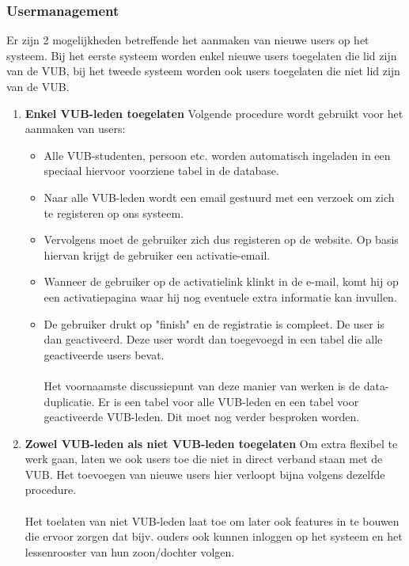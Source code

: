 \subsubsection{Usermanagement}
Er zijn 2 mogelijkheden betreffende het aanmaken van nieuwe users op het systeem. Bij het eerste systeem worden enkel nieuwe users toegelaten die lid zijn van de VUB, bij het tweede systeem worden ook users toegelaten die niet lid zijn van de VUB.
\begin{enumerate}
	\item
	{
		\textbf{Enkel VUB-leden toegelaten}
			Volgende procedure wordt gebruikt voor het aanmaken van users:
		\begin{itemize}
			\item Alle VUB-studenten, persoon etc. worden automatisch ingeladen in een speciaal hiervoor voorziene tabel in de database.
			\item Naar alle VUB-leden wordt een email gestuurd met een verzoek om zich te registeren op ons systeem.
			\item Vervolgens moet de gebruiker zich dus registeren op de website. Op basis hiervan krijgt de gebruiker een activatie-email.
			\item Wanneer de gebruiker op de activatielink klinkt in de e-mail, komt hij op een activatiepagina waar hij nog eventuele extra informatie kan invullen. 
			\item 
			{
				De gebruiker drukt op "finish" en de registratie is compleet. De user is dan geactiveerd. Deze user wordt dan toegevoegd in een tabel die alle geactiveerde users bevat.
				\\
				\\
				Het voornaamste discussiepunt van deze manier van werken is de data-duplicatie. Er is een tabel voor alle VUB-leden en een tabel voor geactiveerde VUB-leden. Dit moet nog verder besproken worden.
			}
		\end{itemize}

	}
	\item
	{
		\textbf{Zowel VUB-leden als niet VUB-leden toegelaten}
		Om extra flexibel te werk gaan, laten we ook users toe die niet in direct verband staan met de VUB. Het toevoegen van nieuwe users hier verloopt bijna volgens dezelfde procedure.
			\\
			\\
			Het toelaten van niet VUB-leden laat toe om later ook features in te bouwen die ervoor zorgen dat bijv. ouders ook kunnen inloggen op het systeem en het lessenrooster van hun zoon/dochter volgen.
	}
\end{enumerate}

